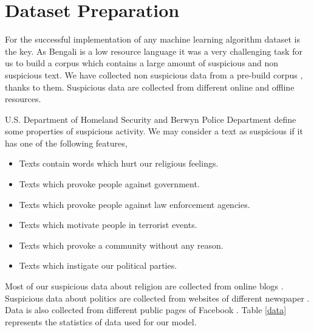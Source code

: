 \section{\textbf{Dataset Preparation}}
For the successful implementation of any machine learning algorithm dataset is the key. As Bengali is a low resource language it was a very challenging task for us to build a corpus which contains a large amount of suspicious and non suspicious text. We have collected non suspicious data from a pre-build corpus \cite{banglacorpus}, thanks to them. Suspicious data are collected from different online and offline resources.%
\par \vspace{0.3cm} 
\noindent
U.S. Department of Homeland Security \cite{homesc} and Berwyn Police Department \cite{bpd} define some properties of suspicious activity. We may consider a text as suspicious if it has one of the following features,
\begin{itemize}
    \item Texts contain words which hurt our religious feelings.\vspace{0.2cm} 
    \item Texts which provoke people against government.\vspace{0.2cm} 
    \item Texts which provoke people against law enforcement agencies.\vspace{0.2cm} 
    \item Texts which motivate people in terrorist events.\vspace{0.2cm} 
    \item Texts which provoke a community without any reason.\vspace{0.2cm} 
    \item Texts which instigate our political parties. 
\end{itemize}
 \par \vspace{0.3cm}
 \noindent
 Most of our suspicious data about religion are collected from online blogs \cite{nastikya, dhormo, istishon}. Suspicious data about politics are collected from websites of different newspaper \cite{palo, kk, juga}. Data is also collected from different public pages of Facebook \cite{bash}. Table \ref{data} represents the statistics of data used for our model.
 
